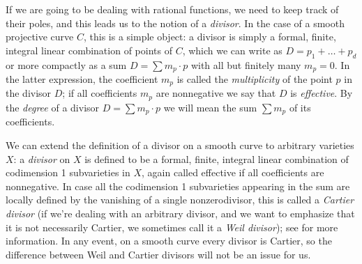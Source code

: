 If we are going to be dealing with rational functions, we need to keep track of their poles, and this leads us to the notion of a \emph{divisor}. In the case of a smooth projective curve $C$, this is a simple object: a divisor is simply a formal, finite, integral linear combination of points of $C$, which we can write as $D = p_1+\dots+p_d$ or more compactly as a sum $D = \sum m_p\cdot p$ with all but finitely many $m_p=0$.  In the latter expression, the coefficient $m_p$ is called the \emph{multiplicity} of the point $p$ in the divisor $D$; if all coefficients $m_p$ are nonnegative we say that $D$ is \emph{effective}. By the \emph{degree} of a divisor $D = \sum m_p\cdot p$ we will mean the sum $\sum m_p$ of its coefficients.

We can extend the definition of a divisor on a smooth curve to arbitrary varieties $X$: a \emph{divisor} on $X$ is defined to be a formal, finite, integral linear combination of codimension 1 subvarieties in $X$, again called effective if all coefficients are nonnegative. In case all the codimension 1 subvarieties appearing in the sum are locally defined by the vanishing of a single nonzerodivisor, this is called a \emph{Cartier divisor} (if we're dealing with an arbitrary divisor, and we want to emphasize that it is not necessarily Cartier, we sometimes call it a \emph{Weil divisor}); see \cite[pp. 140-146]{H} for more information. In any event, on a smooth curve every divisor is Cartier, so the difference between Weil and Cartier divisors will not be an issue for us.

%
%
%
%

